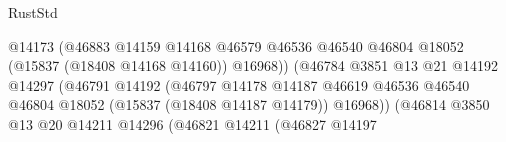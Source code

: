 \begin{lexlean}{RustStd}
\begin{coremodule}
{\begin{coremodule}
{{{{{{{{{{{{{{{{{{{{{{{{{{{{{{{{{{{{{{{{{{{{{{{{{{{{{{{{{{{{                                                          @14173
                                                          (@46883
                                                            @14159
                                                            @14168
                                                            @46579
                                                            @46536
                                                            @46540
                                                            @46804
                                                            @18052
                                                            (@15837 (@18408 @14168 @14160))
                                                            @16968))
                                                        (@46784
                                                          @3851
                                                          @13
                                                          @21
                                                          @14192
                                                          @14297
                                                          (@46791
                                                            @14192
                                                            (@46797
                                                              @14178
                                                              @14187
                                                              @46619
                                                              @46536
                                                              @46540
                                                              @46804
                                                              @18052
                                                              (@15837 (@18408 @14187 @14179))
                                                              @16968))
                                                          (@46814
                                                            @3850
                                                            @13
                                                            @20
                                                            @14211
                                                            @14296
                                                            (@46821
                                                              @14211
                                                              (@46827
                                                                @14197
}}}}}}}}}}}}}}}}}}}}}}}}}}}}}}}}}}}}}}}}}}}}}}}}}}}}}}}}}}}}
\end{coremodule}}
\end{coremodule}
\end{lexlean}

